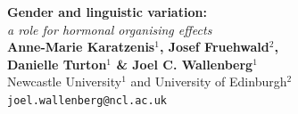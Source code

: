 \documentclass[a0,portrait]{a0poster}
\begin{document}


\begin{minipage}[b]{0.70\linewidth}
\veryHuge \color{NavyBlue} \textbf{Gender and linguistic variation:} \color{Black}\\ %
\Huge\textit{a role for hormonal organising effects}\\[2cm] %
\huge \textbf{Anne-Marie Karatzenis$^1$, Josef Fruehwald$^2$, \\Danielle Turton$^1$ \& Joel C. Wallenberg$^1$}\\[0.5cm] %
\huge Newcastle University$^1$ and University of Edinburgh$^2$ \\[0.4cm] %
\Large \texttt{joel.wallenberg@ncl.ac.uk}\\
\end{minipage}
%
\end{document}
